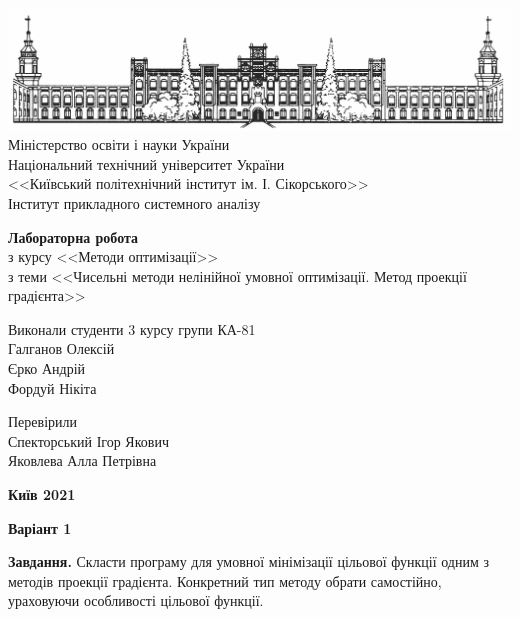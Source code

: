 \documentclass{extreport}
\begin{document}
\begin{titlepage}
    \thispagestyle{empty}
    \begin{center}
        \includegraphics[width = \textwidth]{kpi}
        Міністерство освіти і науки України\\
        Національний технічний університет України\\
        <<Київський політехнічний інститут ім. І. Сікорського>>\\
        Інститут прикладного системного аналізу
    \end{center}
    \vspace{40mm}
    \begin{center}
        \textbf{Лабораторна робота} \\
        з курсу <<Методи оптимізації>> \\
        з теми <<Чисельні методи нелінійної умовної оптимізації. 
        Метод проекції градієнта>>
    \end{center}
    \vspace{20mm}
    \begin{flushleft}
        Виконали студенти 3 курсу групи КА-81 \\
        Галганов Олексій \\
        Єрко Андрій \\
        Фордуй Нікіта
    \end{flushleft}
    \begin{flushright}
        Перевірили \\
        Спекторський Ігор Якович \\
        Яковлева Алла Петрівна
    \end{flushright}
    \vspace{30mm}
    \begin{center}
        \textbf{Київ 2021}
    \end{center}
\end{titlepage}

\begin{center}
    \textbf{Варіант 1}
\end{center}
\textbf{Завдання.} Скласти програму для умовної мінімізації цільової функції
одним з методів проекції градієнта. Конкретний тип методу обрати
самостійно, ураховуючи особливості цільової функції.
\end{document}
